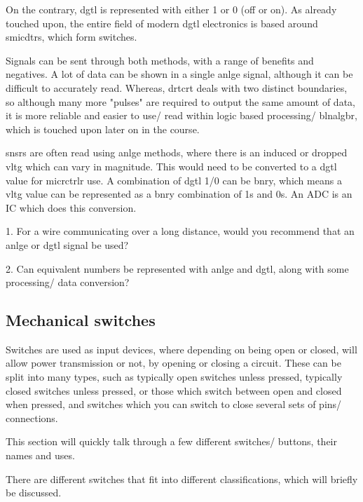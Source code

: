 \documentclass[a4paper,11pt]{report}
\newcommand{\Quiz}[1] %
{
\par\noindent %
\phantomsection %
\todo[inline, color=blue!30]{\textbf{#1}} %
\vspace{1em} %
}
\begin{document}
On the contrary, \gls{dgtl} is represented with either 1 or 0 (off or on). As already touched upon, the entire field of modern \gls{dgtl} electronics is based around \gls{smicdtr}s, which form switches.

Signals can be sent through both methods, with a range of benefits and negatives. A lot of data can be shown in a single \gls{anlge} signal, although it can be difficult to accurately read. Whereas, \gls{drtcrt} deals with two distinct boundaries, so although many more "pulses" are required to output the same amount of data, it is more reliable and easier to use/ read within logic based processing/ \gls{blnalgbr}, which is touched upon later on in the course.

\gls{snsr}s are often read using \gls{anlge} methods, where there is an induced or dropped \gls{vltg} which can vary in magnitude. This would need to be converted to a \gls{dgtl} value for \gls{micrctrlr} use. A combination of \gls{dgtl} 1/0 can be \gls{bnry}, which means a \gls{vltg} value can be represented as a \gls{bnry} combination of 1s and 0s. An ADC is an IC which does this conversion.

\Quiz{Quiz}

1. For a wire communicating over a long distance, would you recommend that an \gls{anlge} or \gls{dgtl} signal be used?

2. Can equivalent numbers be represented with \gls{anlge} and \gls{dgtl}, along with some processing/ data conversion?

\vspace*{1\baselineskip}

\subsection{Mechanical switches}

Switches are used as input devices, where depending on being open or closed, will allow power transmission or not, by opening or closing a circuit. These can be split into many types, such as typically open switches unless pressed, typically closed switches unless pressed, or those which switch between open and closed when pressed, and switches which you can switch to close several sets of pins/ connections.

This section will quickly talk through a few different switches/ buttons, their names and uses.

There are different switches that fit into different classifications, which will briefly be discussed.
\end{document}
